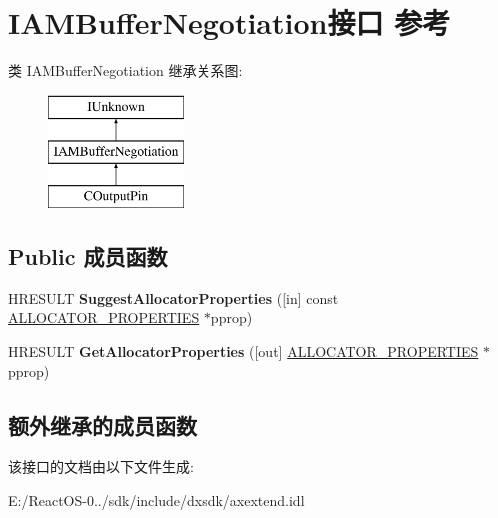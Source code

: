 \hypertarget{interface_i_a_m_buffer_negotiation}{}\section{I\+A\+M\+Buffer\+Negotiation接口 参考}
\label{interface_i_a_m_buffer_negotiation}
类 I\+A\+M\+Buffer\+Negotiation 继承关系图\+:\begin{figure}[H]
\begin{center}
\leavevmode
\includegraphics[height=3.000000cm]{interface_i_a_m_buffer_negotiation}
\end{center}
\end{figure}
\subsection*{Public 成员函数}
\begin{DoxyCompactItemize}
\item 
\mbox{\label{interface_i_a_m_buffer_negotiation_afc83ac509019071c06fe984db921afc7}} 
H\+R\+E\+S\+U\+LT {\bfseries Suggest\+Allocator\+Properties} (\mbox{[}in\mbox{]} const \hyperlink{struct___allocator_properties}{A\+L\+L\+O\+C\+A\+T\+O\+R\+\_\+\+P\+R\+O\+P\+E\+R\+T\+I\+ES} $\ast$pprop)
\item 
\mbox{\label{interface_i_a_m_buffer_negotiation_a40d8cb4070d61b2c630d07a5618c7a04}} 
H\+R\+E\+S\+U\+LT {\bfseries Get\+Allocator\+Properties} (\mbox{[}out\mbox{]} \hyperlink{struct___allocator_properties}{A\+L\+L\+O\+C\+A\+T\+O\+R\+\_\+\+P\+R\+O\+P\+E\+R\+T\+I\+ES} $\ast$pprop)
\end{DoxyCompactItemize}
\subsection*{额外继承的成员函数}


该接口的文档由以下文件生成\+:\begin{DoxyCompactItemize}
\item 
E\+:/\+React\+O\+S-\/0../sdk/include/dxsdk/axextend.\+idl\end{DoxyCompactItemize}
